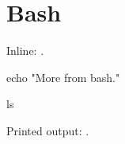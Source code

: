 \documentclass[11pt]{article}
\begin{document}
\section*{Bash}

Inline:  .


\begin{bashcode}
echo "More from bash."
\end{bashcode}


\begin{bashblock}
ls
\end{bashblock}

Printed output:  \printpythontex[verbatim].
\end{document}
